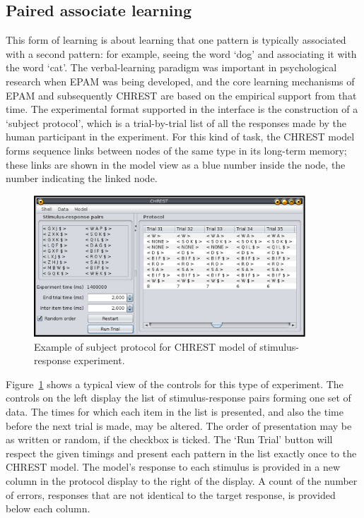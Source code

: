 \documentclass{article}
\begin{document}
\subsection{Paired associate learning}

This form of learning is about learning that one pattern is typically
associated with a second pattern: for example, seeing the word `dog' and
associating it with the word `cat'.  The verbal-learning paradigm was important
in psychological research when EPAM was being developed, and the core learning
mechanisms of EPAM and subsequently CHREST are based on the empirical support
from that time.  The experimental format supported in the interface is the
construction of a `subject protocol', which is a trial-by-trial list of all the
responses made by the human participant in the experiment.  For this kind of
task, the CHREST model forms sequence links between nodes of the same type in
its long-term memory; these links are shown in the model view as a blue number
inside the node, the number indicating the linked node.

\begin{figure}
\includegraphics[width=4.0in]{images/paired-associate.eps}
\caption{Example of subject protocol for CHREST model of stimulus-response
experiment.}
\label{paired-associate}
\end{figure}

Figure~\ref{paired-associate} shows a typical view of the controls for this
type of experiment.  The controls on the left display the list of
stimulus-response pairs forming one set of data.  The times for which each item
in the list is presented, and also the time before the next trial is made, may
be altered.  The order of presentation may be as written or random, if the
checkbox is ticked.  The  `Run Trial' button will respect the given timings and
present each pattern in the list exactly once to the CHREST model.  The model's
response to each stimulus is provided in a new column in the protocol display
to the right of the display.  A count of the number of errors, responses that
are not identical to the target response, is provided below each column.  
\end{document}

